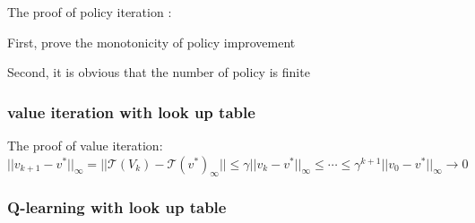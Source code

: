 \documentclass[10pt,a4paper]{article}
\theoremstyle{definition}
\theoremstyle{remark}
\newcommand{\norm}[1]{\vert\vert#1\vert\vert}
\begin{document}
		 \vspace{3ex}
		
		The proof of policy iteration :	
		
			
		First, prove the monotonicity of policy improvement
		
		
		Second, it is obvious that the number of policy is finite 
		
		\subsubsection{value iteration with look up table}
		
		
		\vspace{3ex}
		
		The proof of  value iteration\cite{Tsitsiklis1996}:\\ $\norm{v_{k+1}-v^*}_\infty=\norm{\mathcal{T}(V_k)-\mathcal{T}(v^*)_\infty}\le\gamma\norm{v_k-v^*}_\infty\le\cdots\le\gamma^{k+1}\norm{v_0-v^*}_\infty\to 0$
		
		
		
		\subsubsection{Q-learning with look up table}
		
		
		
\end{document}
